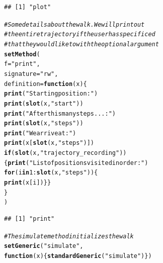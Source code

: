 \documentclass{article}\usepackage[]{graphicx}\usepackage[]{color}
\makeatletter
\newcommand{\hlnum}[1]{\textcolor[rgb]{0.686,0.059,0.569}{#1}}%
\newcommand{\hlstr}[1]{\textcolor[rgb]{0.192,0.494,0.8}{#1}}%
\newcommand{\hlcom}[1]{\textcolor[rgb]{0.678,0.584,0.686}{\textit{#1}}}%
\newcommand{\hlopt}[1]{\textcolor[rgb]{0,0,0}{#1}}%
\newcommand{\hlstd}[1]{\textcolor[rgb]{0.345,0.345,0.345}{#1}}%
\newcommand{\hlkwa}[1]{\textcolor[rgb]{0.161,0.373,0.58}{\textbf{#1}}}%
\newcommand{\hlkwc}[1]{\textcolor[rgb]{0.333,0.667,0.333}{#1}}%
\newcommand{\hlkwd}[1]{\textcolor[rgb]{0.737,0.353,0.396}{\textbf{#1}}}%
\newenvironment{kframe}{%
 \def\at@end@of@kframe{}%
 \ifinner\ifhmode%
  \def\at@end@of@kframe{\end{minipage}}%
  \begin{minipage}{\columnwidth}%
 \fi\fi%
 \def\FrameCommand##1{\hskip\@totalleftmargin \hskip-\fboxsep
 \colorbox{shadecolor}{##1}\hskip-\fboxsep
     \hskip-\linewidth \hskip-\@totalleftmargin \hskip\columnwidth}%
 \MakeFramed {\advance\hsize-\width
   \@totalleftmargin\z@ \linewidth\hsize
   \@setminipage}}%
 {\par\unskip\endMakeFramed%
 \at@end@of@kframe}
\newenvironment{knitrout}{}{} %
\makeatother
\begin{document}
\begin{knitrout}
\begin{kframe}
{\ttfamily\noindent\itshape\color{messagecolor}{\#\# Creating a generic function for 'plot' from package 'graphics' in the global environment}}\begin{verbatim}
## [1] "plot"
\end{verbatim}
\begin{alltt}
\hlcom{# Some details about the walk.  We will print out}
\hlcom{# the entire trajectory if the user has specificed}
\hlcom{# that they would like to with the optional argument}
\hlkwd{setMethod}\hlstd{(}
  \hlkwc{f}\hlstd{=}\hlstr{"print"}\hlstd{,}
  \hlkwc{signature}\hlstd{=}\hlstr{"rw"}\hlstd{,}
  \hlkwc{definition}\hlstd{=}\hlkwa{function}\hlstd{(}\hlkwc{x}\hlstd{)\{}
    \hlkwd{print}\hlstd{(}\hlstr{"Starting position:"}\hlstd{)}
    \hlkwd{print}\hlstd{(}\hlkwd{slot}\hlstd{(x,}\hlstr{"start"}\hlstd{))}
    \hlkwd{print}\hlstd{(}\hlstr{"After this many steps...:"}\hlstd{)}
    \hlkwd{print}\hlstd{(}\hlkwd{slot}\hlstd{(x,}\hlstr{"steps"}\hlstd{))}
    \hlkwd{print}\hlstd{(}\hlstr{"We arrive at:"}\hlstd{)}
    \hlkwd{print}\hlstd{(x[}\hlkwd{slot}\hlstd{(x,}\hlstr{"steps"}\hlstd{)])}
    \hlkwa{if} \hlstd{(}\hlkwd{slot}\hlstd{(x,}\hlstr{"trajectory_recording"}\hlstd{))}
    \hlstd{\{} \hlkwd{print}\hlstd{(}\hlstr{"List of positions visited in order:"}\hlstd{)}
      \hlkwa{for} \hlstd{(i} \hlkwa{in} \hlnum{1}\hlopt{:}\hlkwd{slot}\hlstd{(x,}\hlstr{"steps"}\hlstd{)) \{}
        \hlkwd{print}\hlstd{(x[i]) \}\}}
  \hlstd{\}}
\hlstd{)}
\end{alltt}


{\ttfamily\noindent\itshape\color{messagecolor}{\#\# Creating a generic function for 'print' from package 'base' in the global environment}}\begin{verbatim}
## [1] "print"
\end{verbatim}
\begin{alltt}
\hlcom{# The simulate method initializes the walk}
\hlkwd{setGeneric}\hlstd{(}\hlstr{"simulate"}\hlstd{,}
           \hlkwa{function}\hlstd{(}\hlkwc{x}\hlstd{)\{}\hlkwd{standardGeneric}\hlstd{(}\hlstr{"simulate"}\hlstd{)\})}
\end{alltt}



\end{kframe}
\end{knitrout}
\end{document}
